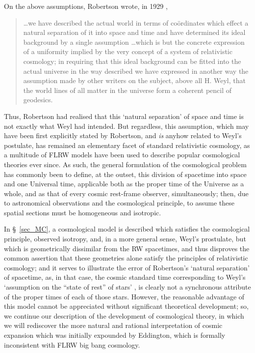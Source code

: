 On the above assumptions, Robertson wrote, in 1929 \cite{Robertson1929},
\begin{quotation}
\ldots we have described the actual world in terms of co\"{o}rdinates which effect a natural separation of it into space and time and have determined its ideal background by a single assumption \ldots which is but the concrete expression of a uniformity implied by the very concept of a system of relativistic cosmology; in requiring that this ideal background can be fitted into the actual universe in the way described we have expressed in another way the assumption made by other writers on the subject, above all H. Weyl, that the world lines of all matter in the universe form a coherent pencil of geodesics.
\end{quotation}

Thus, Robertson had realised that this `natural separation' of space and time is not exactly what Weyl had intended. But regardless, this assumption, which may have been first explicitly stated by Robertson, and \textit{is} anyhow related to Weyl's postulate, has remained an elementary facet of standard relativistic cosmology, as a multitude of FLRW models have been used to describe popular cosmological theories ever since. As such, the general formulation of the cosmological problem has commonly been to define, at the outset, this division of spacetime into space and one Universal time, applicable both as the proper time of the Universe as a whole, and as that of every cosmic rest-frame observer, simultaneously; then, due to astronomical observations and the cosmological principle, to assume these spatial sections must be homogeneous and isotropic.

In \S~\ref{sec_MC}, a cosmological model is described which satisfies the cosmological principle, observed isotropy, and, in a more general sense, Weyl's prostulate, but which is geometrically dissimilar from the RW spacetimes, and thus disproves the common assertion that these geometries alone satisfy the principles of relativistic cosmology; and it serves to illustrate the error of Robertson's `natural separation' of spacetime, as, in that case, the cosmic standard time corresponding to Weyl's `assumption on the ``state of rest'' of stars' \cite{Weyl2009}, is clearly not a synchronous attribute of the proper times of each of those stars. However, the reasonable advantage of this model cannot be appreciated without significant theoretical development; so, we continue our description of the development of cosmological theory, in which we will rediscover the more natural and rational interpretation of cosmic expansion which was initially expounded by Eddington, which is formally inconsistent with FLRW big bang cosmology.

